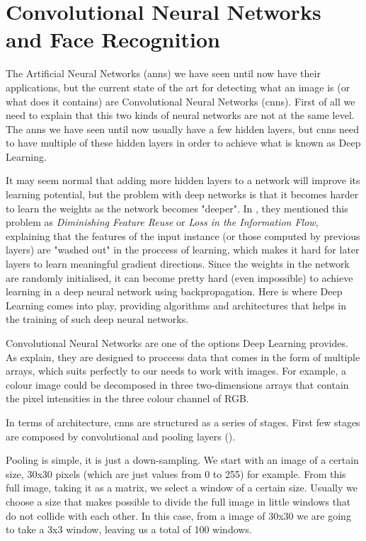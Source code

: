 \section{Convolutional Neural Networks and Face Recognition}
The Artificial Neural Networks (\glspl{ann}) we have seen until now have their applications, but the current state of the art for detecting what an image is (or what does it contains) are Convolutional Neural Networks (\glspl{cnn}). First of all we need to explain that this two kinds of neural networks are not at the same level. The \glspl{ann} we have seen until now usually have a few hidden layers, but \glspl{cnn} need to have multiple of these hidden layers in order to achieve what is known as Deep Learning. 

It may seem normal that adding more hidden layers to a network will improve its learning potential, but the problem with deep networks is that it becomes harder to learn the weights as the network becomes "deeper". In \cite{huang2016deep}, they mentioned this problem as \textit{Diminishing Feature Reuse} or \textit{Loss in the Information Flow}, explaining that the features of the input instance (or those computed by previous layers) are "washed out" in the proccess of learning, which makes it hard for later layers to learn meaningful gradient directions. Since the weights in the network are randomly initialised, it can become pretty hard (even impossible) to achieve learning in a deep neural network using backpropagation. Here is where Deep Learning comes into play, providing algorithms and architectures that helps in the training of such deep neural networks. 

Convolutional Neural Networks are one of the options Deep Learning provides. As \cite{lecun2015deep} explain, they are designed to proccess data that comes in the form of multiple arrays, which suits perfectly to our needs to work with images. For example, a colour image could be decomposed in three two-dimensions arrays that contain the pixel intensities in the three colour channel of RGB. 


In terms of architecture, \glspl{cnn} are structured as a series of stages. First few stages are composed by convolutional and pooling layers (\cite{lecun2015deep}). 

Pooling is simple, it is just a down-sampling. We start with an image of a certain size, 30x30 pixels (which are just values from 0 to 255) for example. From this full image, taking it as a matrix, we select a window of a certain size. Usually we choose a size that makes possible to divide the full image in little windows that do not collide with each other. In this case, from a image of 30x30 we are going to take a 3x3 window, leaving us a total of 100 windows. 

